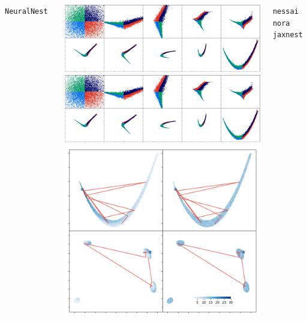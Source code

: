 \documentclass[aspectratio=169]{beamer}
\begin{document}
\begin{frame}
\begin{columns}[t]
        \vfill
        \texttt{NeuralNest}~
        \begin{columns}
            \includegraphics[width=\textwidth]{figures/rosenbrock_flow.png}
            \includegraphics[width=\textwidth]{figures/himmelblau_flow.png}
            \includegraphics[width=\textwidth]{figures/chains.png}
        \end{columns}
        \texttt{nessai}~ \texttt{nora}~ \texttt{jaxnest}~

\end{columns}
\end{frame}
\end{document}
